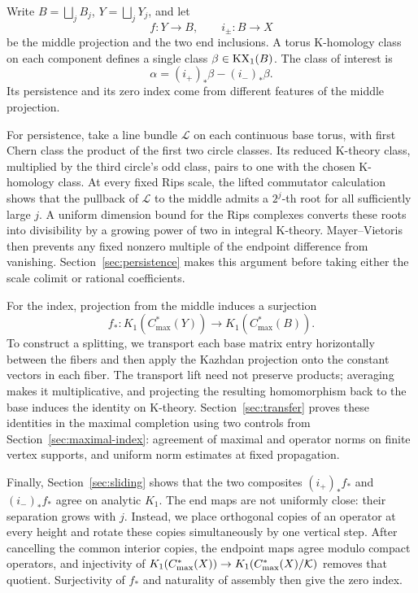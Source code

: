 Write $B=\bigsqcup_jB_j$, $Y=\bigsqcup_jY_j$, and let
\[
 f:Y\longrightarrow B,\qquad i_\pm:B\longrightarrow X
\]
be the middle projection and the two end inclusions. A torus K-homology
class on each component defines a single class $\beta\in\operatorname{KX}_1(B)$.
The class of interest is
\[
 \alpha=(i_+)_*\beta-(i_-)_*\beta.
\]
Its persistence and its zero index come from different features of the
middle projection.

For persistence, take a line bundle $\mathcal L$ on each continuous base
torus, with first Chern class the product of the first two circle classes.
Its reduced K-theory class, multiplied by the third circle's odd class,
pairs to one with the chosen K-homology class. At every fixed Rips scale,
the lifted commutator calculation shows that the pullback of $\mathcal L$
to the middle admits a $2^j$-th root for all sufficiently large $j$.
A uniform dimension bound for the Rips complexes converts these roots
into divisibility by a growing power of two in integral K-theory.
Mayer--Vietoris then prevents any fixed nonzero multiple of the endpoint
difference from vanishing. Section~\ref{sec:persistence} makes this
argument before taking either the scale colimit or rational coefficients.

For the index, projection from the middle induces a surjection
\[
 f_*:K_1(C^*_{\max}(Y))\longrightarrow K_1(C^*_{\max}(B)).
\]
To construct a splitting, we transport each base matrix entry horizontally
between the fibers and then apply the Kazhdan projection onto the constant
vectors in each fiber. The transport lift need not preserve products;
averaging makes it multiplicative, and projecting the resulting
homomorphism back to the base induces the identity on K-theory.
Section~\ref{sec:transfer} proves these identities in the maximal completion
using two controls from Section~\ref{sec:maximal-index}: agreement of
maximal and operator norms on finite vertex supports, and uniform norm
estimates at fixed propagation.

Finally, Section~\ref{sec:sliding} shows that the two composites
$(i_+)_*f_*$ and $(i_-)_*f_*$ agree on analytic $K_1$. The end maps are
not uniformly close: their separation grows with $j$. Instead, we place
orthogonal copies of an operator at every height and rotate these copies
simultaneously by one vertical step. After cancelling the common interior
copies, the endpoint maps agree modulo compact operators, and injectivity
of $K_1(C^*_{\max}(X))\to K_1(C^*_{\max}(X)/\mathcal K)$ removes that quotient.
Surjectivity of $f_*$ and naturality of assembly then give the zero index.
